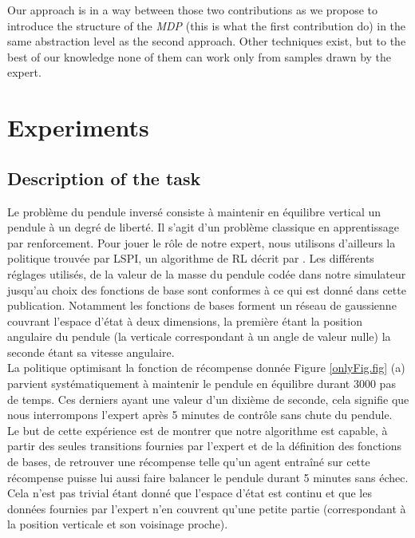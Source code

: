 \documentclass{article}
\begin{document}

Our approach is in a way between those two contributions as we propose to introduce the structure of the \emph{MDP} (this is what the first contribution do) in the same abstraction level as the second approach. Other techniques exist, but to the best of our knowledge none of them can work only from samples drawn by the expert.

\section{Experiments}
\label{exp.sec}
\subsection{Description of the task}
Le problème du pendule inversé consiste à maintenir en équilibre vertical un pendule à un degré de liberté. Il s'agit d'un problème classique en apprentissage par renforcement. Pour jouer le rôle de notre expert, nous utilisons d'ailleurs la politique trouvée par LSPI, un algorithme de RL décrit par \citet{lagoudakis2003least}. Les différents réglages utilisés, de la valeur de la masse du pendule codée dans notre simulateur jusqu'au choix des fonctions de base sont conformes à ce qui est donné dans cette publication. Notamment les fonctions de bases forment un réseau de gaussienne couvrant l'espace d'état à deux dimensions, la première étant la position angulaire du pendule (la verticale correspondant à un angle de valeur nulle) la seconde étant sa vitesse angulaire.\\

La politique optimisant la fonction de récompense donnée Figure \ref{onlyFig.fig} (a) parvient systématiquement à maintenir le pendule en équilibre durant 3000 pas de temps. Ces derniers ayant une valeur d'un dixième de seconde, cela signifie que nous interrompons l'expert après 5 minutes de contrôle sans chute du pendule.\\

Le but de cette expérience est de montrer que notre algorithme est capable, à partir des seules transitions fournies par l'expert et de la définition des fonctions de bases, de retrouver une récompense telle qu'un agent entraîné sur cette récompense puisse lui aussi faire balancer le pendule durant 5 minutes sans échec. Cela n'est pas trivial étant donné que l'espace d'état est continu et que les données fournies par l'expert n'en couvrent qu'une petite partie (correspondant à la position verticale et son voisinage proche).\\
\end{document}
